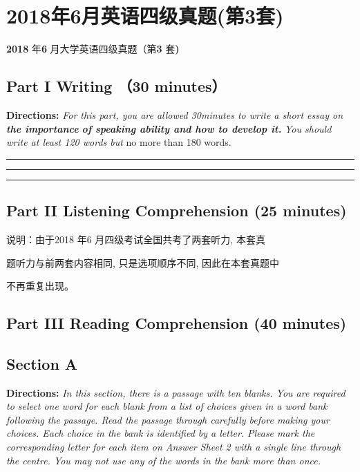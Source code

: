 \documentclass[UTF8,11pt]{ctexart}
\begin{document}
\section*{2018年6月英语四级真题(第3套)}
\textbf{2018} 年\textbf{6} 月大学英语四级真题（第\textbf{3} 套\textbf{)}


\subsection*{\textbf{Part I} \textbf{Writing} （\textbf{30 minutes}）}


\textbf{Directions:}\textit{ For this part, you are allowed 30minutes to write a short essay on}\textbf{\textit{ the importance}} \textbf{\textit{of speaking ability and how to develop it.}}\textit{ You should write at least 120 words but }no more than 180 words.


\par\noindent\rule{.95\linewidth}{.4pt}\par


\par\noindent\rule{.95\linewidth}{.4pt}\par


\par\noindent\rule{.95\linewidth}{.4pt}\par


\subsection*{\textbf{Part II} \textbf{Listening Comprehension} \textbf{(25 minutes)}}


说明：由于2018 年6 月四级考试全国共考了两套听力, 本套真


题听力与前两套内容相同, 只是选项顺序不同, 因此在本套真题中


不再重复出现。


\subsection*{\textbf{Part} III \textbf{Reading Comprehension} \textbf{(40 minutes)}}


\subsection*{\textbf{Section A}}


\textbf{Directions:}\textit{ In this section, there is a passage with ten blanks. You are required to select one word} \textit{for each blank from a list of choices given in a word bank following the passage. Read the passage} \textit{through carefully before making your choices. Each choice in the bank is identified by a letter.} \textit{Please mark the corresponding letter for each item on Answer Sheet 2 with a single line through} \textit{the centre. You may not use any of the words in the bank more than once.}
\end{document}
